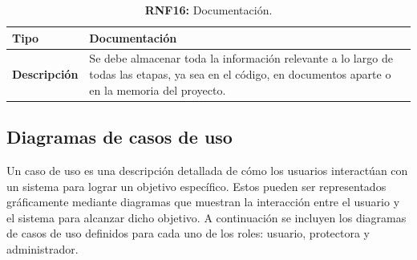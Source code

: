 \documentclass[a4paper, 12pt]{article}
\begin{document}
\begin{table}[H]
\captionsetup{list=no}%
\captionsetup{justification=raggedright,singlelinecheck=false}
\captionsetup{labelformat=empty}
\caption{\textbf{RNF16:} Documentación.}
\label{tab:RNF16}
    \begin{tabular}{|m{5cm}|m{10cm}|}
	    \hline
	    \textbf{Tipo} & Documentación \\ 
	    \hline
	    \textbf{Descripción} & Se debe almacenar toda la información relevante a lo largo de todas las etapas, ya sea en el código, en documentos aparte o en la memoria del proyecto. \\ 
	    \hline
    \end{tabular}
\end{table}



\subsection{Diagramas de casos de uso}

Un caso de uso es una descripción detallada de cómo los usuarios interactúan con un sistema para lograr un objetivo específico. Estos pueden ser representados gráficamente mediante diagramas que muestran la interacción entre el usuario y el sistema para alcanzar dicho objetivo. A continuación se incluyen los diagramas de casos de uso definidos para cada uno de los roles: usuario, protectora y administrador.
\end{document}
